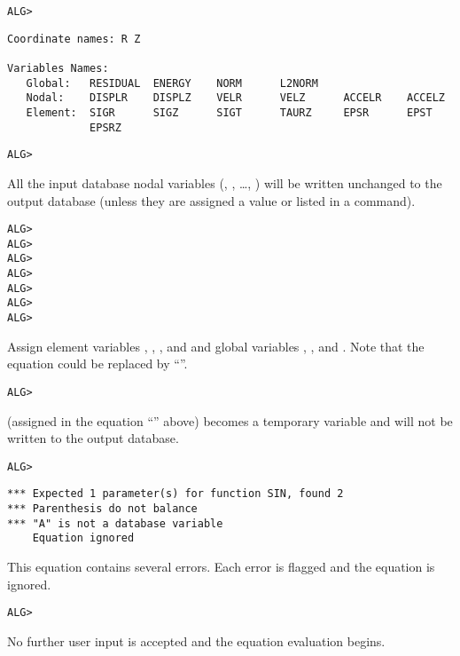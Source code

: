 \verb|ALG>| 
\begin{verbatim}
Coordinate names: R Z

Variables Names:
   Global:   RESIDUAL  ENERGY    NORM      L2NORM
   Nodal:    DISPLR    DISPLZ    VELR      VELZ      ACCELR    ACCELZ
   Element:  SIGR      SIGZ      SIGT      TAURZ     EPSR      EPST
             EPSRZ
\end{verbatim}

\verb|ALG>| 

\begin{comments}
All the input database nodal variables (, , \ldots,
) will be written unchanged to the output database (unless
they are assigned a value or listed in a  command).
\end{comments}

\newpage
\verb|ALG>|
 \\
\verb|ALG>|
 \\
\verb|ALG>|
 \\
\verb|ALG>|
 \\
\verb|ALG>|
 \\
\verb|ALG>|
 \\
\verb|ALG>|

\begin{comments}
Assign element variables , , , and
 and global variables , , and
. Note that the  equation could be replaced by
``''.
\end{comments}

\verb|ALG>| 

\begin{comments}
 (assigned in the equation ``'' above)
becomes a temporary variable and will not be written to the output
database.
\end{comments}

\verb|ALG>| 
\vspace{-\medskipamount} 
\begin{verbatim}
*** Expected 1 parameter(s) for function SIN, found 2
*** Parenthesis do not balance
*** "A" is not a database variable
    Equation ignored
\end{verbatim}

\begin{comments}
This equation contains several errors. Each error is flagged and the
equation is ignored.
\end{comments}

\verb|ALG>| 

\begin{comments}
No further user input is accepted and the equation evaluation
begins.
\end{comments}

